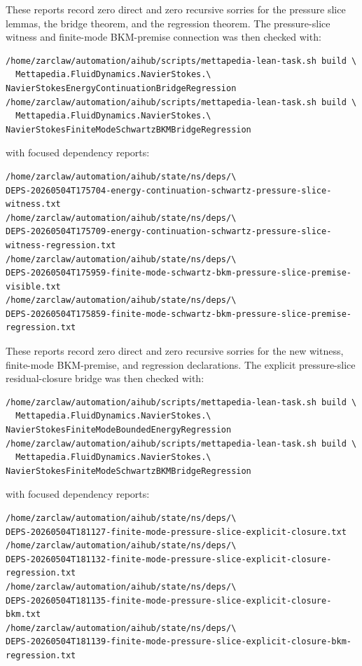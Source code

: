 \documentclass[11pt]{article}
\begin{document}
These reports record zero direct and zero recursive sorries for the pressure
slice lemmas, the bridge theorem, and the regression theorem.
The pressure-slice witness and finite-mode BKM-premise connection was then
checked with:
\begin{verbatim}
/home/zarclaw/automation/aihub/scripts/mettapedia-lean-task.sh build \
  Mettapedia.FluidDynamics.NavierStokes.\
NavierStokesEnergyContinuationBridgeRegression
/home/zarclaw/automation/aihub/scripts/mettapedia-lean-task.sh build \
  Mettapedia.FluidDynamics.NavierStokes.\
NavierStokesFiniteModeSchwartzBKMBridgeRegression
\end{verbatim}
with focused dependency reports:
\begin{verbatim}
/home/zarclaw/automation/aihub/state/ns/deps/\
DEPS-20260504T175704-energy-continuation-schwartz-pressure-slice-witness.txt
/home/zarclaw/automation/aihub/state/ns/deps/\
DEPS-20260504T175709-energy-continuation-schwartz-pressure-slice-witness-regression.txt
/home/zarclaw/automation/aihub/state/ns/deps/\
DEPS-20260504T175959-finite-mode-schwartz-bkm-pressure-slice-premise-visible.txt
/home/zarclaw/automation/aihub/state/ns/deps/\
DEPS-20260504T175859-finite-mode-schwartz-bkm-pressure-slice-premise-regression.txt
\end{verbatim}
These reports record zero direct and zero recursive sorries for the new witness,
finite-mode BKM-premise, and regression declarations.
The explicit pressure-slice residual-closure bridge was then checked with:
\begin{verbatim}
/home/zarclaw/automation/aihub/scripts/mettapedia-lean-task.sh build \
  Mettapedia.FluidDynamics.NavierStokes.\
NavierStokesFiniteModeBoundedEnergyRegression
/home/zarclaw/automation/aihub/scripts/mettapedia-lean-task.sh build \
  Mettapedia.FluidDynamics.NavierStokes.\
NavierStokesFiniteModeSchwartzBKMBridgeRegression
\end{verbatim}
with focused dependency reports:
\begin{verbatim}
/home/zarclaw/automation/aihub/state/ns/deps/\
DEPS-20260504T181127-finite-mode-pressure-slice-explicit-closure.txt
/home/zarclaw/automation/aihub/state/ns/deps/\
DEPS-20260504T181132-finite-mode-pressure-slice-explicit-closure-regression.txt
/home/zarclaw/automation/aihub/state/ns/deps/\
DEPS-20260504T181135-finite-mode-pressure-slice-explicit-closure-bkm.txt
/home/zarclaw/automation/aihub/state/ns/deps/\
DEPS-20260504T181139-finite-mode-pressure-slice-explicit-closure-bkm-regression.txt
\end{verbatim}
\end{document}

